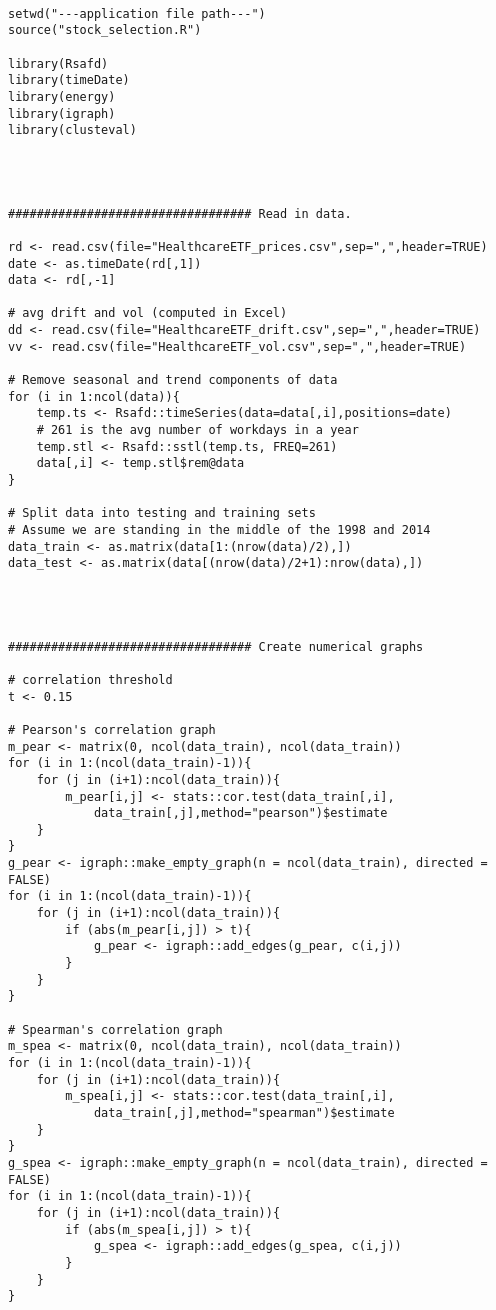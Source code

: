 {
\begin{lstlisting}

setwd("---application file path---")
source("stock_selection.R")

library(Rsafd)
library(timeDate)
library(energy)
library(igraph)
library(clusteval)




################################## Read in data.

rd <- read.csv(file="HealthcareETF_prices.csv",sep=",",header=TRUE)
date <- as.timeDate(rd[,1])
data <- rd[,-1]

# avg drift and vol (computed in Excel)
dd <- read.csv(file="HealthcareETF_drift.csv",sep=",",header=TRUE)
vv <- read.csv(file="HealthcareETF_vol.csv",sep=",",header=TRUE)

# Remove seasonal and trend components of data
for (i in 1:ncol(data)){
	temp.ts <- Rsafd::timeSeries(data=data[,i],positions=date)
	# 261 is the avg number of workdays in a year
	temp.stl <- Rsafd::sstl(temp.ts, FREQ=261) 
	data[,i] <- temp.stl$rem@data
}

# Split data into testing and training sets
# Assume we are standing in the middle of the 1998 and 2014
data_train <- as.matrix(data[1:(nrow(data)/2),])
data_test <- as.matrix(data[(nrow(data)/2+1):nrow(data),])




################################## Create numerical graphs

# correlation threshold
t <- 0.15

# Pearson's correlation graph
m_pear <- matrix(0, ncol(data_train), ncol(data_train))
for (i in 1:(ncol(data_train)-1)){
	for (j in (i+1):ncol(data_train)){
		m_pear[i,j] <- stats::cor.test(data_train[,i],
			data_train[,j],method="pearson")$estimate
	}
}
g_pear <- igraph::make_empty_graph(n = ncol(data_train), directed = FALSE)
for (i in 1:(ncol(data_train)-1)){
	for (j in (i+1):ncol(data_train)){
		if (abs(m_pear[i,j]) > t){
			g_pear <- igraph::add_edges(g_pear, c(i,j))
		}
	}
}

# Spearman's correlation graph
m_spea <- matrix(0, ncol(data_train), ncol(data_train))
for (i in 1:(ncol(data_train)-1)){
	for (j in (i+1):ncol(data_train)){
		m_spea[i,j] <- stats::cor.test(data_train[,i],
			data_train[,j],method="spearman")$estimate
	}
}
g_spea <- igraph::make_empty_graph(n = ncol(data_train), directed = FALSE)
for (i in 1:(ncol(data_train)-1)){
	for (j in (i+1):ncol(data_train)){
		if (abs(m_spea[i,j]) > t){
			g_spea <- igraph::add_edges(g_spea, c(i,j))
		}
	}
}


\end{lstlisting}}
